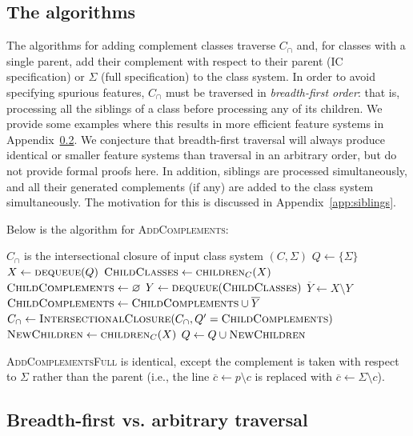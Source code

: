 \documentclass[12pt, oneside]{article}   	%
\begin{document}
\subsection{The algorithms}

The algorithms for adding complement classes traverse $C_\cap$ and, for classes with a single parent, add their complement with respect to their parent (IC specification) or $\Sigma$ (full specification) to the class system. In order to avoid specifying spurious features, $C_\cap$ must be traversed in \textit{breadth-first order}: that is, processing all the siblings of a class before processing any of its children. We provide some examples where this results in more efficient feature systems in Appendix~\ref{app:bfs}. We conjecture that breadth-first traversal will always produce identical or smaller feature systems than traversal in an arbitrary order, but do not provide formal proofs here. In addition, siblings are processed simultaneously, and all their generated complements (if any) are added to the class system simultaneously. The motivation for this is discussed in Appendix~\ref{app:siblings}.

Below is the algorithm for \textsc{AddComplements}:
\noindent \begin{algorithmic}
	\singlespacing
	\REQUIRE $C_\cap$ is the intersectional closure of input class system $(C, \Sigma)$
	\STATE
	\STATE $Q \leftarrow \{\Sigma\}$
	\STATE
	\STATE $X \leftarrow \textsc{dequeue}(Q)$
	\STATE $\textsc{ChildClasses} \leftarrow \textsc{children}_C(X)$
	\STATE $\textsc{ChildComplements} \leftarrow \varnothing$
	\STATE $Y \leftarrow \textsc{dequeue}(\textsc{ChildClasses})$
	\STATE $\overline{Y} \leftarrow X \setminus Y$
	\STATE $\textsc{ChildComplements} \leftarrow \textsc{ChildComplements} \cup \overline{Y}$
	\ENDIF
	\ENDWHILE
	\STATE $C_\cap \leftarrow \textsc{IntersectionalClosure}(C_\cap, Q' = \textsc{ChildComplements})$
	\STATE $\textsc{NewChildren} \leftarrow \textsc{children}_C(X)$
	\STATE $Q \leftarrow Q \cup \textsc{NewChildren}$
	\ENDWHILE
\end{algorithmic}
\doublespacing

\noindent \textsc{AddComplementsFull} is identical, except the complement is taken with respect to $\Sigma$ rather than the parent (i.e., the line $\overline{c} \leftarrow p \setminus c$ is replaced with $\overline{c} \leftarrow \Sigma \setminus c$).

\subsection{Breadth-first vs. arbitrary traversal}
\label{app:bfs}
\end{document}
